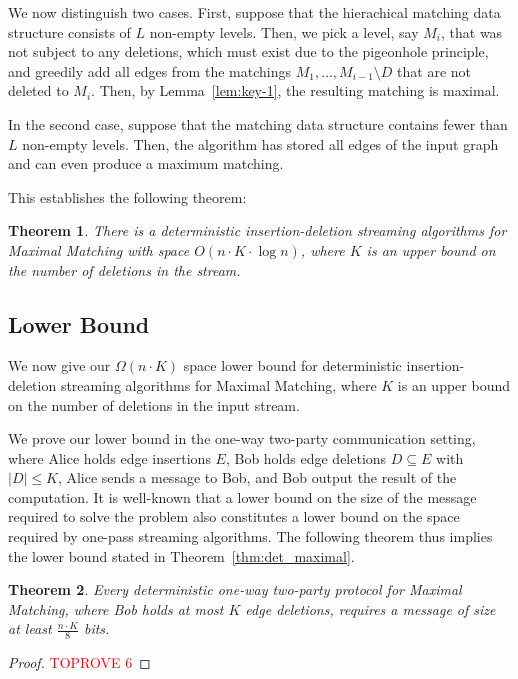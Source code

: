 \documentclass[11pt,a4paper]{article}
\newtheorem{theorem}{Theorem}
\begin{document}
We now distinguish two cases. First, suppose that the hierachical matching data structure consists of $L$ non-empty levels. Then, we pick a level, say $M_i$, that was not subject to any deletions, which must exist due to the pigeonhole principle, and greedily add all edges from the matchings $M_1, \dots, M_{i-1} \setminus D$ that are not deleted to $M_i$. Then, by Lemma~\ref{lem:key-1}, the resulting matching is maximal.

In the second case, suppose that the matching data structure contains fewer than $L$ non-empty levels. Then, the algorithm has stored all edges of the input graph and can even produce a maximum matching. 

This establishes the following theorem:

\begin{theorem} \label{thm:det-alg}
    There is a deterministic insertion-deletion streaming algorithms for \textsf{Maximal Matching} with space $O(n \cdot K \cdot \log n)$, where $K$ is an upper bound on the number of deletions in the stream. 
\end{theorem}



\subsection{Lower Bound} \label{sec:det-lb}
We now give our $\Omega(n \cdot K)$ space lower bound for deterministic insertion-deletion streaming algorithms for \textsf{Maximal Matching}, where $K$ is an upper bound on the number of deletions in the input stream. 

We prove our lower bound in the one-way two-party communication setting, where Alice holds edge insertions $E$,  Bob holds edge deletions $D \subseteq E$ with $|D| \le K$, Alice sends a message to Bob, and Bob output the result of the computation. It is well-known that a lower bound on the size of the message required to solve the problem also constitutes a lower bound on the space required by one-pass streaming algorithms. The following theorem thus implies the lower bound stated in Theorem~\ref{thm:det_maximal}.

\begin{theorem}
 Every deterministic one-way two-party protocol for \textsf{Maximal Matching}, where Bob holds at most $K$ edge deletions, requires a message of size at least $\frac{n \cdot K}{8}$ bits.
\end{theorem}

\begin{proof}\textcolor{red}{TOPROVE 6}\end{proof}
\end{document}
